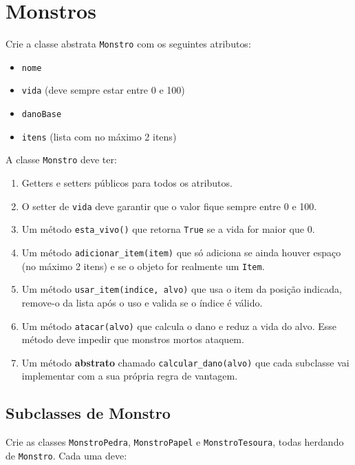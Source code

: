 \documentclass{article}
\begin{document}
\section{Monstros}

Crie a classe abstrata \texttt{Monstro} com os seguintes atributos:

\begin{itemize}
    \item \texttt{nome}
    \item \texttt{vida} (deve sempre estar entre 0 e 100)
    \item \texttt{danoBase}
    \item \texttt{itens} (lista com no máximo 2 itens)
\end{itemize}

A classe \texttt{Monstro} deve ter:

\begin{enumerate}
    \item Getters e setters públicos para todos os atributos.
    \item O setter de \texttt{vida} deve garantir que o valor fique sempre entre 0 e 100.
    \item Um método \texttt{esta\_vivo()} que retorna \texttt{True} se a vida for maior que 0.
    \item Um método \texttt{adicionar\_item(item)} que só adiciona se ainda houver espaço
          (no máximo 2 itens) e se o objeto for realmente um \texttt{Item}.
    \item Um método \texttt{usar\_item(indice, alvo)} que usa o item da posição indicada,
          remove-o da lista após o uso e valida se o índice é válido.
    \item Um método \texttt{atacar(alvo)} que calcula o dano e reduz a vida do alvo.
          Esse método deve impedir que monstros mortos ataquem.
    \item Um método \textbf{abstrato} chamado \texttt{calcular\_dano(alvo)} que cada
          subclasse vai implementar com a sua própria regra de vantagem.
\end{enumerate}

\subsection{Subclasses de Monstro}

Crie as classes \texttt{MonstroPedra}, \texttt{MonstroPapel} e \texttt{MonstroTesoura},
todas herdando de \texttt{Monstro}. Cada uma deve:
\end{document}
